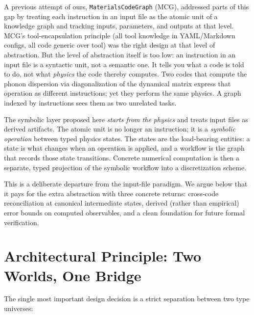 \documentclass[11pt,a4paper]{article}
\begin{document}
A previous attempt of ours, \texttt{MaterialsCodeGraph} (MCG), addressed parts of this gap by
treating each instruction in an input file as the atomic unit of a knowledge graph and tracking
inputs, parameters, and outputs at that level. MCG's tool-encapsulation principle (all tool
knowledge in YAML/Markdown configs, all code generic over tool) was the right design at that
level of abstraction. But the level of abstraction itself is too low: an instruction in an input
file is a syntactic unit, not a semantic one. It tells you what a code is told to do, not what
\emph{physics} the code thereby computes. Two codes that compute the phonon dispersion via
diagonalization of the dynamical matrix express that operation as different instructions; yet
they perform the same physics. A graph indexed by instructions sees them as two unrelated tasks.

\medskip

The symbolic layer proposed here \emph{starts from the physics} and treats input files as derived
artifacts. The atomic unit is no longer an instruction; it is a \emph{symbolic operation} between
typed physics states. The states are the load-bearing entities: a state is what changes when an
operation is applied, and a workflow is the graph that records those state transitions. Concrete
numerical computation is then a separate, typed projection of the symbolic workflow into a
discretization scheme.

This is a deliberate departure from the input-file paradigm. We argue below that it pays for the
extra abstraction with three concrete returns: cross-code reconciliation at canonical intermediate
states, derived (rather than empirical) error bounds on computed observables, and a clean
foundation for future formal verification.

\section{Architectural Principle: Two Worlds, One Bridge}
\label{sec:principle}

The single most important design decision is a strict separation between two type universes:
\end{document}

